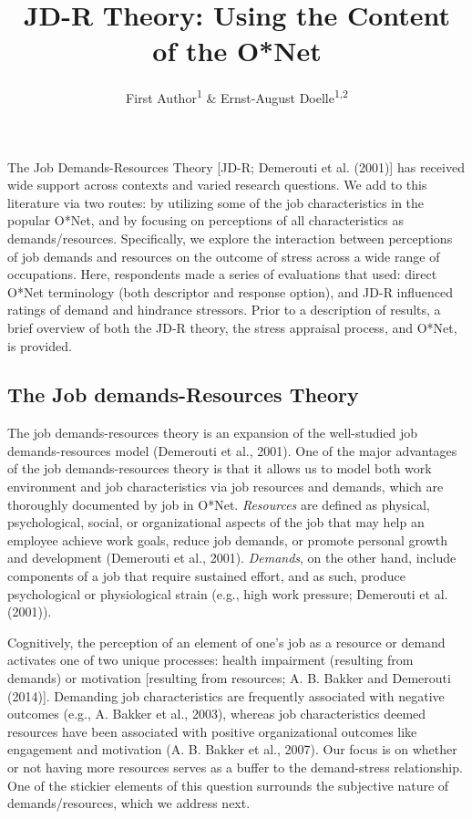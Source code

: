 \documentclass[
  english,
  man]{apa6}
\title{JD-R Theory: Using the Content of the O*Net}
\author{First Author\textsuperscript{1} \& Ernst-August Doelle\textsuperscript{1,2}}
\date{}
\affiliation{\vspace{0.5cm}\textsuperscript{1} Wilhelm-Wundt-University\\\textsuperscript{2} Konstanz Business School}
\begin{document}
\maketitle

The Job Demands-Resources Theory {[}JD-R; Demerouti et al. (2001){]} has received wide support across contexts and varied research questions. We add to this literature via two routes: by utilizing some of the job characteristics in the popular O*Net, and by focusing on perceptions of all characteristics as demands/resources. Specifically, we explore the interaction between perceptions of job demands and resources on the outcome of stress across a wide range of occupations. Here, respondents made a series of evaluations that used: direct O*Net terminology (both descriptor and response option), and JD-R influenced ratings of demand and hindrance stressors. Prior to a description of results, a brief overview of both the JD-R theory, the stress appraisal process, and O*Net, is provided.

\hypertarget{the-job-demands-resources-theory}{%
\subsection{The Job demands-Resources Theory}\label{the-job-demands-resources-theory}}

The job demands-resources theory is an expansion of the well-studied job demands-resources model (Demerouti et al., 2001). One of the major advantages of the job demands-resources theory is that it allows us to model both work environment and job characteristics via job resources and demands, which are thoroughly documented by job in O*Net. \emph{Resources} are defined as physical, psychological, social, or organizational aspects of the job that may help an employee achieve work goals, reduce job demands, or promote personal growth and development (Demerouti et al., 2001). \emph{Demands}, on the other hand, include components of a job that require sustained effort, and as such, produce psychological or physiological strain (e.g., high work pressure; Demerouti et al. (2001)).

Cognitively, the perception of an element of one's job as a resource or demand activates one of two unique processes: health impairment (resulting from demands) or motivation {[}resulting from resources; A. B. Bakker and Demerouti (2014){]}. Demanding job characteristics are frequently associated with negative outcomes (e.g., A. Bakker et al., 2003), whereas job characteristics deemed resources have been associated with positive organizational outcomes like engagement and motivation (A. B. Bakker et al., 2007). Our focus is on whether or not having more resources serves as a buffer to the demand-stress relationship. One of the stickier elements of this question surrounds the subjective nature of demands/resources, which we address next.
\end{document}
